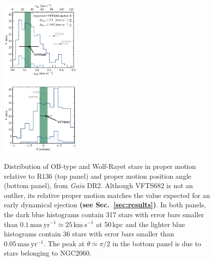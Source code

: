 \documentclass[a4paper,fleqn,usenatbib]{mnras}
\newcommand{\newtext}[1]{{\color{ForestGreen}\bf{#1}}}
\newcommand{\kms}{{\,\mathrm{km\ s^{-1}}}}
\DeclareRobustCommand{\Secref}[1]{Sec.~\ref{#1}}
\begin{document}
\begin{figure}%
  \centering
  \includegraphics[width=0.35\textwidth]{figures/dist_mu_region.pdf}\\
  \vspace*{-5pt}
  \includegraphics[width=0.35\textwidth]{figures/angle}
  \caption{Distribution of OB-type and Wolf-Rayet stars in proper
    motion relative to R136 (top panel) and proper motion position angle
    (bottom panel), from \emph{Gaia} DR2. Although VFTS682 is not an outlier, its relative
    proper motion matches the value expected for an early dynamical
    ejection \newtext{(see \Secref{sec:results})}. In both
    panels, the dark blue histograms contain 317 
    stars with error bars smaller than $0.1\,\mathrm{mas \
      yr^{-1}}\simeq25\,\mathrm{km\ s^{-1}}$ at 50\,kpc and the
    lighter blue histograms contain 36 stars with error bars smaller than $0.05\,\mathrm{mas \
    yr^{-1}}$. The peak at $\theta\simeq\pi/2$ in the bottom panel is due to stars
  belonging to NGC2060. }
  \label{fig:dist}
\end{figure}
\end{document}
